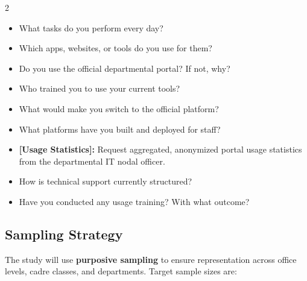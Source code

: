 \documentclass[11pt,a4paper]{article}
\begin{document}
\vspace{0.3cm}
\begin{multicols}{2}
\begin{streamboxa}
\small
\begin{itemize}[leftmargin=1em,itemsep=3pt,topsep=2pt]
  \item What tasks do you perform every day?
  \item Which apps, websites, or tools do you use for them?
  \item Do you use the official departmental portal? If not, why?
  \item Who trained you to use your current tools?
  \item What would make you switch to the official platform?
\end{itemize}
\end{streamboxa}

\columnbreak

\begin{streamboxb}
\small
\begin{itemize}[leftmargin=1em,itemsep=3pt,topsep=2pt]
  \item What platforms have you built and deployed for staff?
  \item \textbf{[Usage Statistics]:} Request aggregated, anonymized portal usage statistics from the departmental IT nodal officer.
  \item How is technical support currently structured?
  \item Have you conducted any usage training? With what outcome?
\end{itemize}
\end{streamboxb}
\end{multicols}

\vspace{0.4cm}

\subsection{Sampling Strategy}

The study will use \textbf{purposive sampling} to ensure representation across
office levels, cadre classes, and departments. Target sample sizes are:
\end{document}
